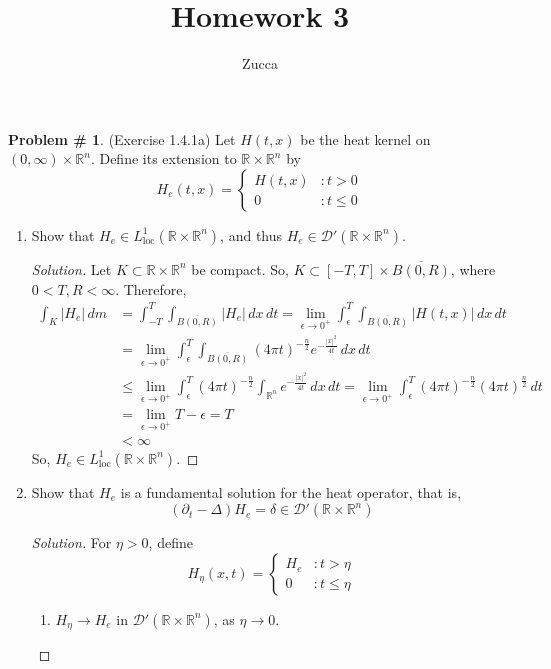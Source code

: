 \documentclass[12pt]{article}
\title{Homework 3}
\author{Zucca}
\newenvironment{solution}{\begin{proof}[Solution]}{\end{proof}}
\begin{document}
	\thispagestyle{firstpage}
	\textbf{Problem \# 1}. (Exercise 1.4.1a) Let $H(t,x)$ be the heat kernel on $(0,\infty)\times \mathbb{R}^n$. Define its extension to $\mathbb{R}\times \mathbb{R}^n$ by 
	\[
		H_e(t,x)=
		\begin{cases}
			H(t,x) & : t> 0 \\
			0 & : t\leq 0
		\end{cases}
	\]
	\begin{enumerate}[label=(\alph*)]
		\item Show that $H_e \in L^1_{\text{loc}}(\mathbb{R}\times \mathbb{R}^n)$, and thus $H_e\in \mathcal{D}'(\mathbb{R}\times \mathbb{R}^n)$.

	\begin{solution} Let $K\subset \mathbb{R}\times \mathbb{R}^n$ be compact. So, $K\subset [-T,T]\times\overline{B(0,R)}$, where $0<T,R<\infty$. Therefore,
		\begin{equation}
			\begin{aligned}
				\int_K |H_e|\,dm &= \int_{-T}^T \int_{\overline{B(0,R)}} |H_e|\,dx\,dt = \lim_{\epsilon\to 0^+} \int_\epsilon^T \int_{\overline{B(0,R)}}|H(t,x)|\,dx\,dt \\ 
				&= \lim_{\epsilon\to 0^+}\int_\epsilon^T \int_{\overline{B(0,R)}} (4\pi t)^{-\frac{n}{2}}e^{-\frac{|x|^2}{4t}}\,dx\,dt \\
				&\leq \lim_{\epsilon\to 0^+} \int_\epsilon^T (4\pi t)^{-\frac{n}{2}}\int_{\mathbb{R}^n}e^{-\frac{|x|^2}{4t}}\,dx\,dt = \lim_{\epsilon\to 0^+}\int_\epsilon^T (4\pi t)^{-\frac{n}{2}}(4\pi t)^{\frac{n}{2}}\,dt \\
				&= \lim_{\epsilon\to 0^+} T-\epsilon = T \\
				&< \infty
			\end{aligned}
		\end{equation}
		So, $H_e\in L^1_{\text{loc}}(\mathbb{R}\times \mathbb{R}^n)$.
	\end{solution}
\item Show that $ H_e $ is a fundamental solution for the heat operator, that is,
\[
	(\partial_t -\Delta)H_e = \delta\in \mathcal{D}'(\mathbb{R}\times \mathbb{R}^n)
\]
\begin{solution}
	For $ \eta > 0 $, define
	\[
		H_\eta(x,t) = \begin{cases}
			H_e & : t> \eta \\
			0 & : t\leq\eta
		\end{cases}
	\]
	\begin{enumerate}[label=(\roman*)]
		\item $H_\eta\to H_e$ in $\mathcal{D}'(\mathbb{R}\times \mathbb{R}^n)$, as $\eta\to 0$.
		

\end{enumerate}
\end{solution}
\end{enumerate}
\end{document}
